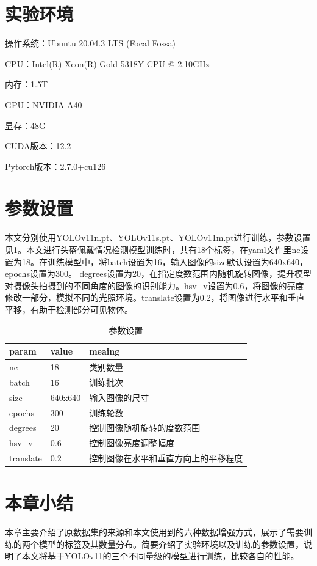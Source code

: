 \section{实验环境}
操作系统：Ubuntu 20.04.3 LTS (Focal Fossa)

CPU：Intel(R) Xeon(R) Gold 5318Y CPU @ 2.10GHz

内存：1.5T

GPU：NVIDIA A40

显存：48G

CUDA版本：12.2

Pytorch版本：2.7.0+cu126

\section{参数设置}
本文分别使用YOLOv11n.pt、YOLOv11s.pt、YOLOv11m.pt进行训练，参数设置见\ref{tab:param}。本文进行头盔佩戴情况检测模型训练时，共有18个标签，在yaml文件里nc设置为18。在训练模型中，将batch设置为16，输入图像的size默认设置为640x640，epochs设置为300。
degrees设置为20，在指定度数范围内随机旋转图像，提升模型对摄像头拍摄到的不同角度的图像的识别能力。hsv\_v设置为0.6，将图像的亮度修改一部分，模拟不同的光照环境。translate设置为0.2，将图像进行水平和垂直平移，有助于检测部分可见物体。

\begin{table}[htb]
    \centering
    \caption[标签解释]{参数设置\label{tab:param}}
    \begin{tabular}{lll}
        \toprule
        \multicolumn{1}{l}{param} & \multicolumn{1}{l}{value} & \multicolumn{1}{l}{meaing}\\
        \midrule
        nc & 18 & 类别数量\\
        batch & 16 & 训练批次\\
        size & 640x640 & 输入图像的尺寸\\
        epochs & 300 & 训练轮数\\
        degrees & 20 & 控制图像随机旋转的度数范围\\
        hsv\_v & 0.6 & 控制图像亮度调整幅度\\
        translate & 0.2 & 控制图像在水平和垂直方向上的平移程度\\
        \bottomrule
    \end{tabular}
\end{table}


\section{本章小结}
本章主要介绍了原数据集的来源和本文使用到的六种数据增强方式，展示了需要训练的两个模型的标签及其数量分布。简要介绍了实验环境以及训练的参数设置，说明了本文将基于YOLOv11的三个不同量级的模型进行训练，比较各自的性能。


